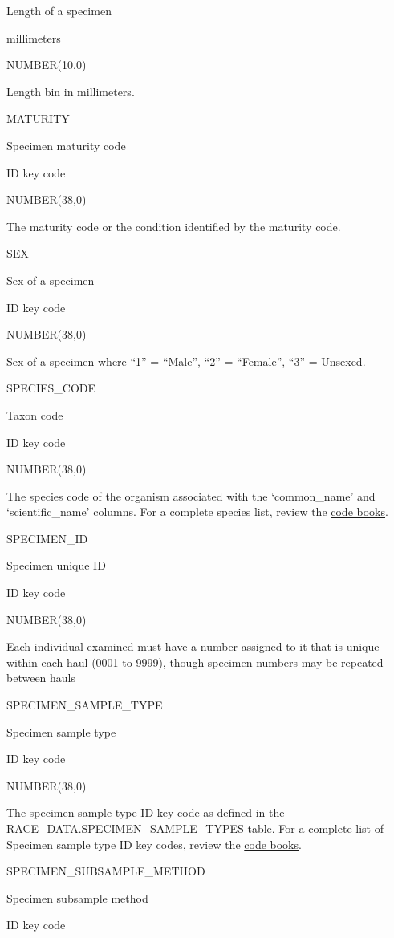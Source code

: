 \documentclass[
  letterpaper,
  oneside,
  open=any]{scrbook}
\begin{document}
Length of a specimen

millimeters

NUMBER(10,0)

Length bin in millimeters.

MATURITY

Specimen maturity code

ID key code

NUMBER(38,0)

The maturity code or the condition identified by the maturity code.

SEX

Sex of a specimen

ID key code

NUMBER(38,0)

Sex of a specimen where ``1'' = ``Male'', ``2'' = ``Female'', ``3'' =
Unsexed.

SPECIES\_CODE

Taxon code

ID key code

NUMBER(38,0)

The species code of the organism associated with the `common\_name' and
`scientific\_name' columns. For a complete species list, review the
\href{https://www.fisheries.noaa.gov/resource/document/groundfish-survey-species-code-manual-and-data-codes-manual}{code
books}.

SPECIMEN\_ID

Specimen unique ID

ID key code

NUMBER(38,0)

Each individual examined must have a number assigned to it that is
unique within each haul (0001 to 9999), though specimen numbers may be
repeated between hauls

SPECIMEN\_SAMPLE\_TYPE

Specimen sample type

ID key code

NUMBER(38,0)

The specimen sample type ID key code as defined in the
RACE\_DATA.SPECIMEN\_SAMPLE\_TYPES table. For a complete list of
Specimen sample type ID key codes, review the
\href{https://www.fisheries.noaa.gov/resource/document/groundfish-survey-species-code-manual-and-data-codes-manual}{code
books}.

SPECIMEN\_SUBSAMPLE\_METHOD

Specimen subsample method

ID key code
\end{document}
